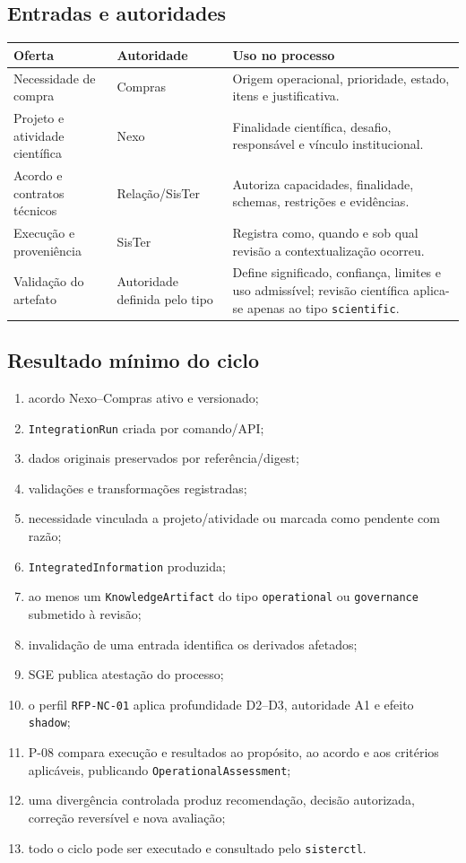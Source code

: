 \documentclass[11pt,a4paper,oneside]{article}
\begin{document}
\subsection{Entradas e autoridades}
\begin{tabularx}{\textwidth}{P{4.0cm}P{4.2cm}Y}
\toprule
\textbf{Oferta} & \textbf{Autoridade} & \textbf{Uso no processo} \\
\midrule
Necessidade de compra & Compras & Origem operacional, prioridade, estado, itens e justificativa. \\
Projeto e atividade científica & Nexo & Finalidade científica, desafio, responsável e vínculo institucional. \\
Acordo e contratos técnicos & Relação/SisTer & Autoriza capacidades, finalidade, schemas, restrições e evidências. \\
Execução e proveniência & SisTer & Registra como, quando e sob qual revisão a contextualização ocorreu. \\
Validação do artefato & Autoridade definida pelo tipo & Define significado, confiança, limites e uso admissível; revisão científica aplica-se apenas ao tipo \texttt{scientific}. \\
\bottomrule
\end{tabularx}

\subsection{Resultado mínimo do ciclo}
\begin{enumerate}
  \item acordo Nexo--Compras ativo e versionado;
  \item \texttt{IntegrationRun} criada por comando/API;
  \item dados originais preservados por referência/digest;
  \item validações e transformações registradas;
  \item necessidade vinculada a projeto/atividade ou marcada como pendente com razão;
  \item \texttt{IntegratedInformation} produzida;
  \item ao menos um \texttt{KnowledgeArtifact} do tipo \texttt{operational} ou \texttt{governance} submetido à revisão;
  \item invalidação de uma entrada identifica os derivados afetados;
  \item SGE publica atestação do processo;
  \item o perfil \texttt{RFP-NC-01} aplica profundidade D2--D3, autoridade A1 e efeito \texttt{shadow};
  \item P-08 compara execução e resultados ao propósito, ao acordo e aos critérios aplicáveis, publicando \texttt{OperationalAssessment};
  \item uma divergência controlada produz recomendação, decisão autorizada, correção reversível e nova avaliação;
  \item todo o ciclo pode ser executado e consultado pelo \texttt{sisterctl}.
\end{enumerate}
\end{document}
